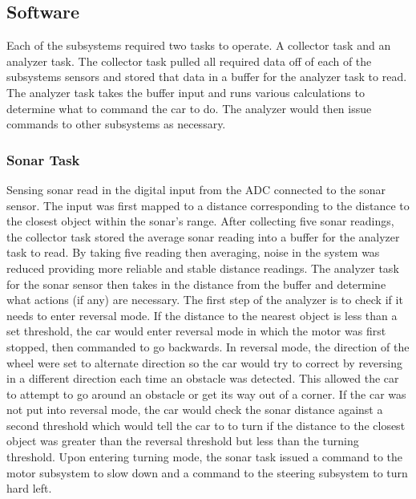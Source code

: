 \documentclass[final,letterpaper,singleside,12pt]{article}
\begin{document}
\pagebreak

\subsection{Software} %
\label{sub:software}
Each of the subsystems required two tasks to operate. A collector task and an analyzer task. The collector task pulled all required data off of each of the subsystems sensors and stored that data in a buffer for the analyzer task to read. The analyzer task takes the buffer input and runs various calculations to determine what to command the car to do. The analyzer would then issue commands to other subsystems as necessary.
\subsubsection{Sonar Task} %
\label{ssub:sonar_task}
Sensing sonar read in the digital input from the ADC connected to the sonar sensor. The input was first mapped to a distance corresponding to the distance to the closest object within the sonar's range. After collecting five sonar readings, the collector task stored the average sonar reading into a buffer for the analyzer task to read. By taking five reading then averaging, noise in the system was reduced providing more reliable and stable distance readings. The analyzer task for the sonar sensor then takes in the distance from the buffer and determine what actions (if any) are necessary. The first step of the analyzer is to check if it needs to enter reversal mode. If the distance to the nearest object is less than a set threshold, the car would enter reversal mode in which the motor was first stopped, then commanded to go backwards. In reversal mode, the direction of the wheel were set to alternate direction so the car would try to correct by reversing in a different direction each time an obstacle was detected. This allowed the car to attempt to go around an obstacle or get its way out of a corner. If the car was not put into reversal mode, the car would check the sonar distance against a second threshold which would tell the car to to turn if the distance to the closest object was greater than the reversal threshold but less than the turning threshold. Upon entering turning mode, the sonar task issued a command to the motor subsystem to slow down and a command to the steering subsystem to turn hard left.
\end{document}
